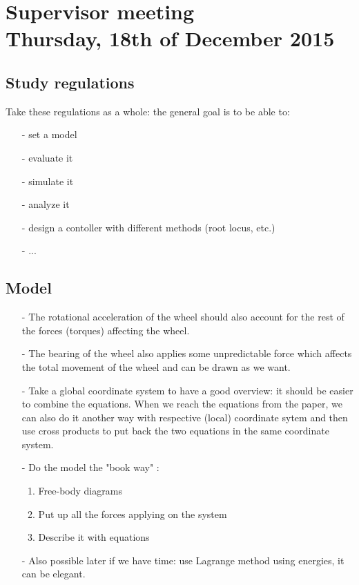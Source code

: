 

\renewcommand\chaptername{KAPITEL}
\renewcommand\contentsname{Indhold}
\renewcommand\figurename{Figur}
\renewcommand\tablename{Tabel}

\section*{Supervisor meeting\\ \small Thursday, 18th of December 2015}

\subsection{Study regulations}
Take these regulations as a whole: the general goal is to be able to:
\begin{itemize}
  \item[-] set a model
  \item[-] evaluate it
  \item[-] simulate it
  \item[-] analyze it
  \item[-] design a contoller with different methods (root locus, etc.)
  \item[-] ...
\end{itemize}

\subsection{Model}
\begin{itemize}
  \item[-] The rotational acceleration of the wheel should also account for the rest of the forces (torques) affecting the wheel.
  \item[-] The bearing of the wheel also applies some unpredictable force which affects the total movement of the wheel and can be drawn as we want.
  \item[-] Take a global coordinate system to have a good overview: it should be easier to combine the equations. When we reach the equations from the paper, we can also do it another way with respective (local) coordinate sytem and then use cross products to put back the two equations in the same coordinate system.
  \item[-] Do the model the "book way" :
    \begin{enumerate} 
      \item Free-body diagrams
      \item Put up all the forces applying on the system
      \item Describe it with equations
    \end{enumerate}
  \item[-] Also possible later if we have time: use Lagrange method using energies, it can be elegant.
\end{itemize}

